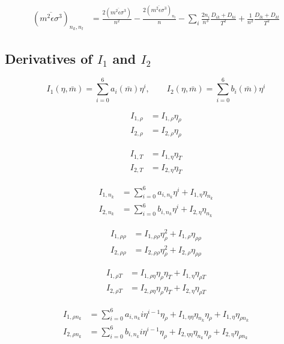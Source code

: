 \documentclass[english]{../thermomemo/thermomemo}
\begin{document}
\begin{align}
  (\overline{m^2\epsilon\sigma^3})_{n_k,n_l} &= \frac{2(\overline{m^2\epsilon\sigma^3})}{n^2} - \frac{2(\overline{m^2\epsilon\sigma^3})_{n_l}}{n} - \sum_i \frac{2n_i}{n^3} \frac{D_{ik} + D_{ki}}{T^2} + \frac{1}{n^2} \frac{D_{lk} + D_{kl}}{T^2}
\end{align}

\subsection{Derivatives of $I_1$ and $I_2$}
\begin{equation}
  I_1(\eta,\bar m) = \sum_{i=0}^6 a_i(\bar m) \eta^i, \qquad  I_2(\eta,\bar m) = \sum_{i=0}^6 b_i(\bar m) \eta^i
\end{equation}

\begin{align}
  I_{1,\rho} &= I_{1,\rho} \eta_{\rho} \\
  I_{2,\rho} &= I_{2,\rho} \eta_{\rho}
\end{align}

\begin{align}
  I_{1,T} &= I_{1,\eta} \eta_{T} \\
  I_{2,T} &= I_{2,\eta} \eta_{T}
\end{align}

\begin{align}
  I_{1,n_k} &= \sum_{i=0}^6 a_{i,n_k} \eta^i + I_{1,\eta} \eta_{n_k} \\
  I_{2,n_k} &= \sum_{i=0}^6 b_{i,n_k} \eta^i + I_{2,\eta} \eta_{n_k}
\end{align}

\begin{align}
  I_{1,\rho\rho} &= I_{1,\rho \rho} \eta_{\rho}^2 + I_{1,\rho} \eta_{\rho\rho} \\
  I_{2,\rho\rho} &= I_{2,\rho \rho} \eta_{\rho}^2 + I_{2,\rho} \eta_{\rho\rho}
\end{align}

\begin{align}
  I_{1,\rho T} &= I_{1,\rho \eta} \eta_\rho \eta_T + I_{1,\eta} \eta_{\rho T} \\
  I_{2,\rho T} &= I_{2,\rho \eta} \eta_\rho \eta_T + I_{2,\eta} \eta_{\rho T}
\end{align}

\begin{align}
  I_{1,\rho n_k} &= \sum_{i=0}^6 a_{i,n_k} i \eta^{i-1} \eta_\rho + I_{1,\eta\eta} \eta_{n_k} \eta_\rho + I_{1,\eta} \eta_{\rho n_k} \\
  I_{2,\rho n_k} &= \sum_{i=0}^6 b_{i,n_k} i \eta^{i-1} \eta_\rho + I_{2,\eta\eta} \eta_{n_k} \eta_\rho + I_{2,\eta} \eta_{\rho n_k}
\end{align}
\end{document}
